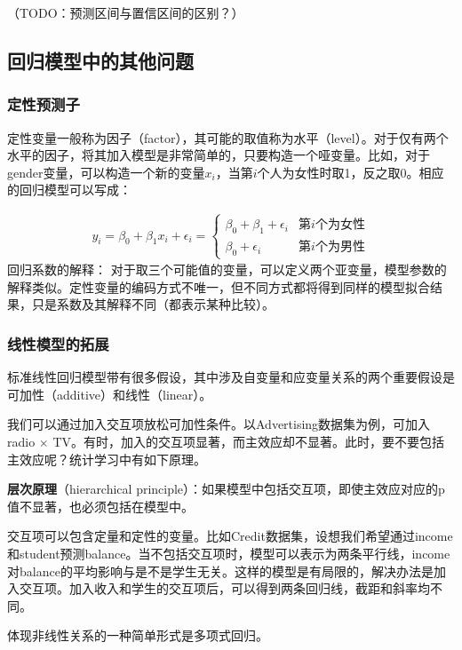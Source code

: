 \documentclass[hyperref,]{ctexart}
\begin{document}
（TODO：预测区间与置信区间的区别？）

\subsection{回归模型中的其他问题}

\subsubsection{定性预测子}

定性变量一般称为因子（factor），其可能的取值称为水平（level）。对于仅有两个水平的因子，将其加入模型是非常简单的，只要构造一个哑变量。比如，对于gender变量，可以构造一个新的变量\(x_i\)，当第\(i\)个人为女性时取1，反之取0。相应的回归模型可以写成：

\[
\begin{eqnarray}
y_i = \beta_0 + \beta_1 x_i + \epsilon_i =
\begin{cases}
\beta_0 + \beta_1 + \epsilon_i       & \mathrm{第}i\mathrm{个为女性} \\
\beta_0 + \epsilon_i       & \mathrm{第}i\mathrm{个为男性}
\end{cases}
\end{eqnarray}
\] 回归系数的解释：
对于取三个可能值的变量，可以定义两个亚变量，模型参数的解释类似。定性变量的编码方式不唯一，但不同方式都将得到同样的模型拟合结果，只是系数及其解释不同（都表示某种比较）。

\subsubsection{线性模型的拓展}

标准线性回归模型带有很多假设，其中涉及自变量和应变量关系的两个重要假设是可加性（additive）和线性（linear）。

我们可以通过加入交互项放松可加性条件。以Advertising数据集为例，可加入radio
\(\times\)
TV。有时，加入的交互项显著，而主效应却不显著。此时，要不要包括主效应呢？统计学习中有如下原理。

\textbf{层次原理}（hierarchical
principle）：如果模型中包括交互项，即使主效应对应的p值不显著，也必须包括在模型中。

交互项可以包含定量和定性的变量。比如Credit数据集，设想我们希望通过income和student预测balance。当不包括交互项时，模型可以表示为两条平行线，income对balance的平均影响与是不是学生无关。这样的模型是有局限的，解决办法是加入交互项。加入收入和学生的交互项后，可以得到两条回归线，截距和斜率均不同。

体现非线性关系的一种简单形式是多项式回归。
\end{document}
